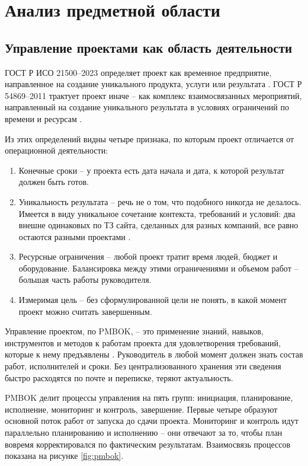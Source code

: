 \section{Анализ предметной области}
\subsection{Управление проектами как область деятельности}

ГОСТ Р ИСО 21500--2023 определяет проект как временное предприятие, направленное на создание уникального продукта, услуги или результата \cite{gost21500}. ГОСТ Р 54869--2011 трактует проект иначе -- как комплекс взаимосвязанных мероприятий, направленный на создание уникального результата в условиях ограничений по времени и ресурсам \cite{gost54869}.

Из этих определений видны четыре признака, по которым проект отличается от операционной деятельности:
\begin{enumerate}
    \item Конечные сроки -- у проекта есть дата начала и дата, к которой результат должен быть готов.
    \item Уникальность результата -- речь не о том, что подобного никогда не делалось. Имеется в виду уникальное сочетание контекста, требований и условий: два внешне одинаковых по ТЗ сайта, сделанных для разных компаний, все равно остаются разными проектами \cite{mazur2014}.
    \item Ресурсные ограничения -- любой проект тратит время людей, бюджет и оборудование. Балансировка между этими ограничениями и объемом работ -- большая часть работы руководителя.
    \item Измеримая цель -- без сформулированной цели не понять, в какой момент проект можно считать завершенным.
\end{enumerate}

Управление проектом, по PMBOK, -- это применение знаний, навыков, инструментов и методов к работам проекта для удовлетворения требований, которые к нему предъявлены \cite{pmbok6}. Руководитель в любой момент должен знать состав работ, исполнителей и сроки. Без централизованного хранения эти сведения быстро расходятся по почте и переписке, теряют актуальность.

PMBOK делит процессы управления на пять групп: инициация, планирование, исполнение, мониторинг и контроль, завершение. Первые четыре образуют основной поток работ от запуска до сдачи проекта. Мониторинг и контроль идут параллельно планированию и исполнению -- они отвечают за то, чтобы план вовремя корректировался по фактическим результатам. Взаимосвязь процессов показана на рисунке \ref{fig:pmbok}.

